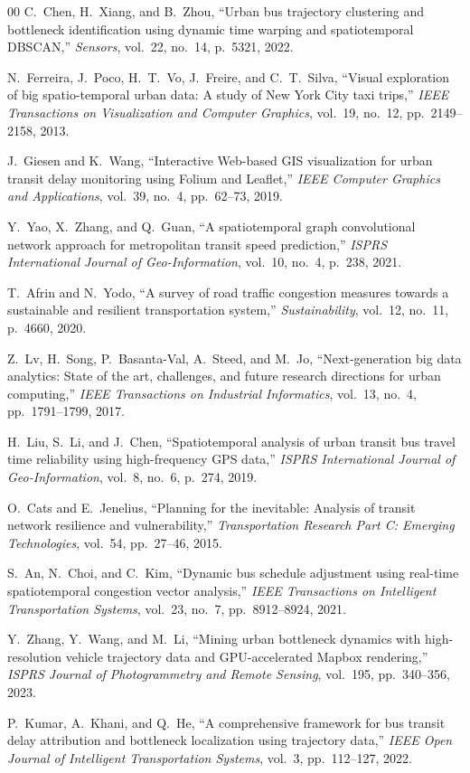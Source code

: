 \documentclass[conference]{IEEEtran}
\begin{document}
\begin{thebibliography}{00}
C.~Chen, H.~Xiang, and B.~Zhou, ``Urban bus trajectory clustering and bottleneck identification using dynamic time warping and spatiotemporal DBSCAN,'' \emph{Sensors}, vol.~22, no.~14, p.~5321, 2022.

N.~Ferreira, J.~Poco, H.~T.~Vo, J.~Freire, and C.~T.~Silva, ``Visual exploration of big spatio-temporal urban data: A study of New York City taxi trips,'' \emph{IEEE Transactions on Visualization and Computer Graphics}, vol.~19, no.~12, pp.~2149--2158, 2013.

J.~Giesen and K.~Wang, ``Interactive Web-based GIS visualization for urban transit delay monitoring using Folium and Leaflet,'' \emph{IEEE Computer Graphics and Applications}, vol.~39, no.~4, pp.~62--73, 2019.

Y.~Yao, X.~Zhang, and Q.~Guan, ``A spatiotemporal graph convolutional network approach for metropolitan transit speed prediction,'' \emph{ISPRS International Journal of Geo-Information}, vol.~10, no.~4, p.~238, 2021.

T.~Afrin and N.~Yodo, ``A survey of road traffic congestion measures towards a sustainable and resilient transportation system,'' \emph{Sustainability}, vol.~12, no.~11, p.~4660, 2020.

Z.~Lv, H.~Song, P.~Basanta-Val, A.~Steed, and M.~Jo, ``Next-generation big data analytics: State of the art, challenges, and future research directions for urban computing,'' \emph{IEEE Transactions on Industrial Informatics}, vol.~13, no.~4, pp.~1791--1799, 2017.

H.~Liu, S.~Li, and J.~Chen, ``Spatiotemporal analysis of urban transit bus travel time reliability using high-frequency GPS data,'' \emph{ISPRS International Journal of Geo-Information}, vol.~8, no.~6, p.~274, 2019.

O.~Cats and E.~Jenelius, ``Planning for the inevitable: Analysis of transit network resilience and vulnerability,'' \emph{Transportation Research Part C: Emerging Technologies}, vol.~54, pp.~27--46, 2015.

S.~An, N.~Choi, and C.~Kim, ``Dynamic bus schedule adjustment using real-time spatiotemporal congestion vector analysis,'' \emph{IEEE Transactions on Intelligent Transportation Systems}, vol.~23, no.~7, pp.~8912--8924, 2021.

Y.~Zhang, Y.~Wang, and M.~Li, ``Mining urban bottleneck dynamics with high-resolution vehicle trajectory data and GPU-accelerated Mapbox rendering,'' \emph{ISPRS Journal of Photogrammetry and Remote Sensing}, vol.~195, pp.~340--356, 2023.

P.~Kumar, A.~Khani, and Q.~He, ``A comprehensive framework for bus transit delay attribution and bottleneck localization using trajectory data,'' \emph{IEEE Open Journal of Intelligent Transportation Systems}, vol.~3, pp.~112--127, 2022.

\end{thebibliography}
\end{document}
